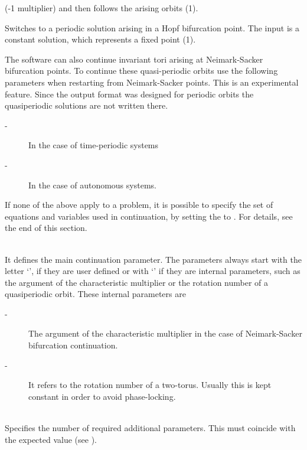 \documentclass[10pt,a4paper]{ddedoc}
\begin{document}
\begin{description}
\begin{description}
(-1 multiplier) and then follows the arising orbits (1).
%
\item[\funp{56} -] Switches to a periodic solution arising in a Hopf bifurcation point. The input is a constant solution, which represents a fixed point (1).
\end{description}
The software can also continue invariant tori arising at Neimark-Sacker bifurcation points. To continue these quasi-periodic orbits use the following parameters when restarting from Neimark-Sacker points. This is an experimental feature. Since the output format was designed for periodic orbits the quasiperiodic solutions are not written there.
\begin{description}
\item[ -] In the case of time-periodic systems
%
\item[ -] In the case of autonomous systems.
\end{description}
If none of the above apply to a problem, it is possible to specify the set of equations and variables used in continuation, by setting the  to . For details, see the end of this section.
%
\item[\funp{CP}] ~\\
It defines the main continuation parameter. The parameters always start with the letter `', if they are user defined or with `' if they are internal parameters, such as the argument of the characteristic multiplier or
the rotation number of a quasiperiodic orbit.
These  internal parameters are
\begin{description}
\item[ -] The argument of the characteristic multiplier in the case of Neimark-Sacker bifurcation continuation.
\item[ -] It refers to the rotation number of a two-torus. Usually this is kept constant in order to avoid phase-locking.
\end{description}
%
\item[\funp{NPARX}] ~\\
Specifies the number of required additional parameters. This must coincide with the expected value (see ).
%
\item[\funp{PARX}] ~\\

\end{description}
\end{document}
